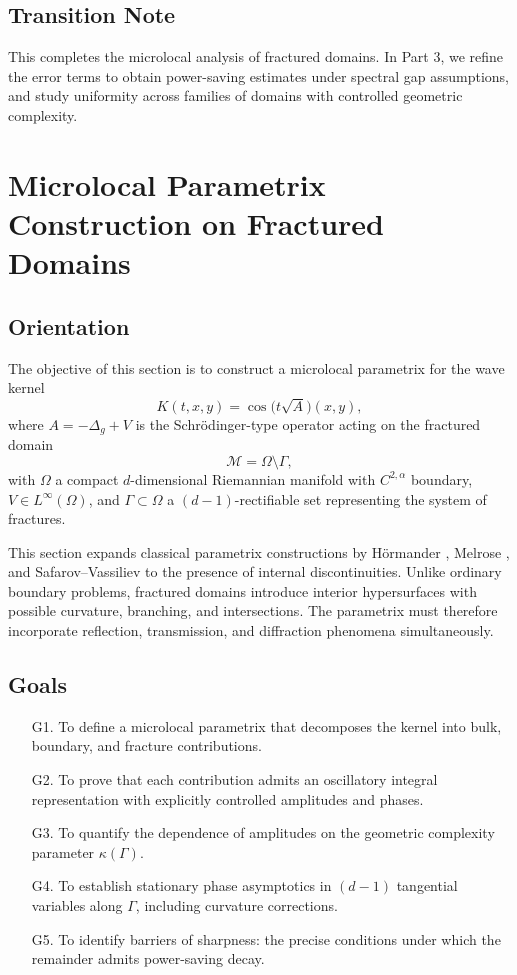 \subsection{Transition Note}

This completes the microlocal analysis of fractured domains. In Part 3, we refine the error terms to obtain power-saving estimates under spectral gap assumptions, and study uniformity across families of domains with controlled geometric complexity.

\section{Microlocal Parametrix Construction on Fractured Domains}
\label{sec:microlocal-parametrix}

\subsection*{Orientation}

The objective of this section is to construct a microlocal parametrix for the wave kernel 
\[
K(t,x,y) = \cos\big(t\sqrt{A}\big)(x,y),
\]
where $A = -\Delta_g + V$ is the Schrödinger-type operator acting on the fractured domain
\[
\mathcal{M} = \Omega \setminus \Gamma,
\]
with $\Omega$ a compact $d$-dimensional Riemannian manifold with $C^{2,\alpha}$ boundary, $V \in L^\infty(\Omega)$, and $\Gamma \subset \Omega$ a $(d-1)$-rectifiable set representing the system of fractures. 

This section expands classical parametrix constructions by Hörmander \cite{Hormander1971,Hormander1983}, Melrose \cite{Melrose1995}, and Safarov--Vassiliev \cite{SafarovVassiliev1997} to the presence of internal discontinuities. 
Unlike ordinary boundary problems, fractured domains introduce interior hypersurfaces with possible curvature, branching, and intersections. 
The parametrix must therefore incorporate reflection, transmission, and diffraction phenomena simultaneously. 

\subsection*{Goals}

\begin{itemize}
  \item[G1.] To define a microlocal parametrix that decomposes the kernel into bulk, boundary, and fracture contributions. 
  \item[G2.] To prove that each contribution admits an oscillatory integral representation with explicitly controlled amplitudes and phases. 
  \item[G3.] To quantify the dependence of amplitudes on the geometric complexity parameter $\kappa(\Gamma)$. 
  \item[G4.] To establish stationary phase asymptotics in $(d-1)$ tangential variables along $\Gamma$, including curvature corrections. 
  \item[G5.] To identify barriers of sharpness: the precise conditions under which the remainder admits power-saving decay. 
\end{itemize}

